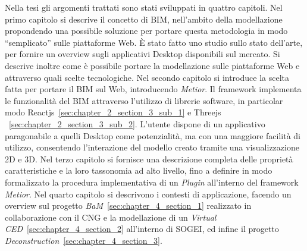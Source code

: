 Nella tesi gli argomenti trattati sono stati sviluppati in quattro capitoli.
Nel primo capitolo si descrive il concetto di BIM, nell’ambito della modellazione propondendo una possibile soluzione
per portare questa metodologia in modo ``semplicato'' sulle piattaforme Web.
\`E stato fatto uno studio sullo stato dell’arte, per fornire un overview
sugli applicativi Desktop disponibili sul mercato. Si descrive inoltre come è
possibile portare la modellazione sulle piattaforme Web e attraverso quali scelte tecnologiche.
Nel secondo capitolo si introduce la scelta fatta per portare il BIM sul Web, introducendo \emph{Metior}.
Il framework implementa le funzionalità del BIM attraverso l'utilizzo di librerie software,
in particolar modo Reactjs~\ref{sec:chapter_2_section_3_sub_1} e Threejs ~\ref{sec:chapter_2_section_3_sub_2}.
L'utente dispone di un applicativo paragonabile a quelli
Desktop come potenzialità, ma con una maggiore facilità di utilizzo, consentendo l'interazione del modello creato
tramite una visualizzazione 2D e 3D.
Nel terzo capitolo si fornisce una descrizione completa delle
proprietà caratteristiche e la loro tassonomia ad alto livello, fino a definire in modo formalizzato
la procedura implementativa di un \emph{Plugin} all'interno del framework \emph{Metior}.
Nel quarto capitolo si descrivono i contesti di applicazione, facendo un overview sul
progetto \emph{BaM}~\ref{sec:chapter_4_section_1} realizzato in collaborazione con il CNG e
la modellazione di un \emph{Virtual CED}~\ref{sec:chapter_4_section_2} all'interno di SOGEI, ed
infine il progetto \emph{Deconstruction}~\ref{sec:chapter_4_section_3}.
